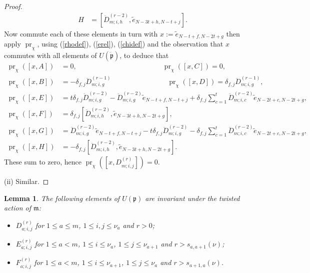 \documentclass[twoside,12pt,reqno]{amsart}
\newtheorem{Lemma}[Proposition]{Lemma}
\def\pr{{\operatorname{pr}}}
\begin{document}
\begin{proof}
\begin{align*}
&H &=[\ddot{D}_{m;i,h}^{(r-2)}, \tilde e_{N-3t+h,N-t+j}].
\end{align*}
Now commute each of these elements in turn with 
$x:=  \tilde e_{N-t+f,N-2t+g}$ then apply $\pr_\chi$, 
using (\ref{rhodef}), (\ref{erel}), (\ref{chidef}) and the observation that
$x$ commutes with all elements of $U(\ddot{\mathfrak{p}})$, 
to deduce that
\begin{align*}
\pr_\chi([x, A]) &=
0,
\qquad\qquad\qquad\qquad\qquad\qquad\:
\pr_\chi([x, C]) =0,\\
\pr_\chi([x, B]) &=
- \delta_{f,j} \ddot{D}_{m;i,g}^{(r-1)}
\qquad\qquad\qquad\qquad
\pr_\chi([x, D]) =
\delta_{f,j} \ddot{D}_{m;i,g}^{(r-1)},\\
\pr_\chi([x, E]) &=
t \delta_{f,j} \ddot{D}_{m;i,g}^{(r-2)}
- \ddot{D}_{m;i,g}^{(r-2)} \tilde e_{N-t+f,N-t+j}
+ \delta_{f,j} \sum_{c=1}^t \ddot{D}_{m;i,c}^{(r-2)}
\tilde e_{N-2t+c,N-2t+g},\\
\pr_\chi([x, F]) &=
\delta_{f,j} [ \ddot{D}_{m;i,h}^{(r-2)}, \tilde e_{N-3t+h,N-2t+g}],\\
\pr_\chi([x, G]) &=
\ddot{D}_{m;i,g}^{(r-2)} \tilde e_{N-t+f,N-t+j}
-t \delta_{f,j} \ddot{D}_{m;i,g}^{(r-2)}
- \delta_{f,j} \sum_{c=1}^t \ddot{D}_{m;i,c}^{(r-2)}
\tilde e_{N-2t+c,N-2t+g}
,\\
\pr_\chi([x, H]) &=-\delta_{f,j} [ \ddot{D}_{m;i,h}^{(r-2)}, \tilde e_{N-3t+h,N-2t+g}].
\end{align*}
These sum to zero, hence $\pr_\chi([x, {D}_{m;i,j}^{(r)}]) = 0$.

(ii) Similar.
\end{proof}

\begin{Lemma}\label{sofar}
The following elements 
of $U(\mathfrak{p})$ are invariant under the twisted action of
$\mathfrak{m}$:
\begin{itemize}
\item[(i)] $D_{a;i,j}^{(r)}$ 
for  $1 \leq a \leq m$, $1 \leq i,j \leq \nu_a$ and $r > 0$;
\item[(ii)] $E_{a;i,j}^{(r)}$ for 
$1 \leq a < m$, $1 \leq i \leq \nu_a$, $1 \leq j \leq \nu_{a+1}$
and $r > s_{a,a+1}(\nu)$;
\item[(iii)] $F_{a;i,j}^{(r)}$ 
 for 
$1 \leq a< m$, $1 \leq i \leq \nu_{a+1}$, $1 \leq j \leq \nu_{a}$
and $r > s_{a+1,a}(\nu)$.
\end{itemize}
\end{Lemma}
\end{document}
